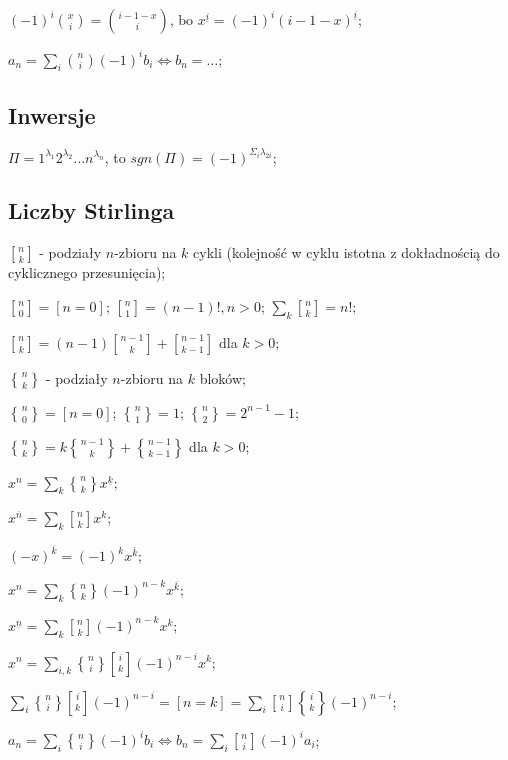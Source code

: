 $(-1)^i\binom{x}{i} = \binom{i - 1 - x}{i} \text{, bo }  x^{\underline{i}} =
  (-1)^i(i - 1 - x)^{\underline{i}}$;

$a_n = \sum_i\binom{n}{i}(-1)^i b_i \iff b_n = \dots$;

\subsection{Inwersje}

$\Pi = 1^{\lambda_1}2^{\lambda_2}\dots n^{\lambda_n}$, to $sgn(\Pi) =
  (-1)^{\Sigma_i\lambda_{2i}}$;

\subsection{Liczby Stirlinga}

${n \brack k}$ - podziały $n$-zbioru na $k$ cykli (kolejność w cyklu istotna z
  dokładnością do cyklicznego przesunięcia);

${n \brack 0} = [ n = 0 ]$;
${n \brack 1} = (n - 1)!, n > 0$;
$\sum_k{n \brack k} = n!$;

${n \brack k} = (n-1){n-1 \brack k}+{n-1 \brack k-1}$ dla ${k > 0}$;

${n \brace k}$ - podziały $n$-zbioru na $k$ bloków;

${n \brace 0} = [n = 0]$;
${n \brace 1} = 1$;
${n \brace 2} = 2^{n-1}-1$;

${n \brace k} = k{n-1 \brace k} + {n-1 \brace k-1}$ dla ${k > 0}$;

$x^n = \sum_k{n \brace k} x^{\underline{k}}$;

$x^{\overline{n}} = \sum_k{n \brack k}x^k$;

$(-x)^{\overline{k}} = (-1)^kx^{\overline{k}}$;

$x^n = \sum_k {n \brace k} (-1)^{n-k} x^{\overline{k}}$;

$x^{\underline{n}} = \sum_k {n \brack k} (-1)^{n-k} x^{k}$;

$x^n = \sum_{i,k} {n \brace i}{i \brack k}(-1)^{n-i}x^k$;

$\sum_i{n \brace i}{i \brack k}(-1)^{n-i} = [n=k] =
  \sum_i{n \brack i}{i \brace k}(-1)^{n-i}$;

$a_n = \sum_i{n \brace i}(-1)^ib_i \iff b_n = \sum_i{n \brack i}(-1)^ia_i$;
